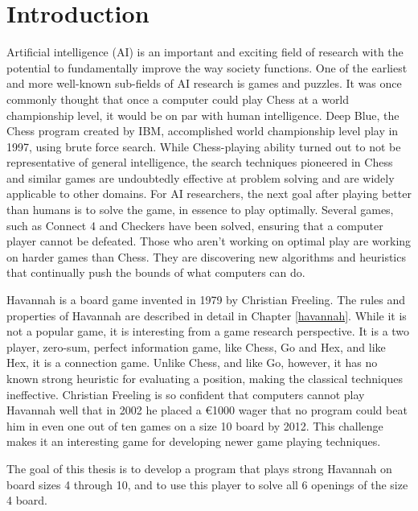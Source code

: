 

\section{Introduction}

Artificial intelligence (AI) is an important and exciting field of research with the potential to fundamentally improve the way society functions. One of the earliest and more well-known sub-fields of AI research is games and puzzles. It was once commonly thought that once a computer could play Chess at a world championship level, it would be on par with human intelligence. Deep Blue, the Chess program created by IBM, accomplished world championship level play in 1997, using brute force search. While Chess-playing ability turned out to not be representative of general intelligence, the search techniques pioneered in Chess and similar games are undoubtedly effective at problem solving and are widely applicable to other domains. For AI researchers, the next goal after playing better than humans is to solve the game, in essence to play optimally. Several games, such as Connect 4 and Checkers have been solved, ensuring that a computer player cannot be defeated. Those who aren't working on optimal play are working on harder games than Chess. They are discovering new algorithms and heuristics that continually push the bounds of what computers can do.

Havannah is a board game invented in 1979 by Christian Freeling. The rules and properties of Havannah are described in detail in Chapter \ref{havannah}. While it is not a popular game, it is interesting from a game research perspective. It is a two player, zero-sum, perfect information game, like Chess, Go and Hex, and like Hex, it is a connection game. Unlike Chess, and like Go, however, it has no known strong heuristic for evaluating a position, making the classical techniques ineffective. Christian Freeling is so confident that computers cannot play Havannah well that in 2002 he placed a \euro 1000 wager that no program could beat him in even one out of ten games on a size 10 board by 2012. This challenge makes it an interesting game for developing newer game playing techniques.

The goal of this thesis is to develop a program that plays strong Havannah on board sizes 4 through 10, and to use this player to solve all 6 openings of the size 4 board.



